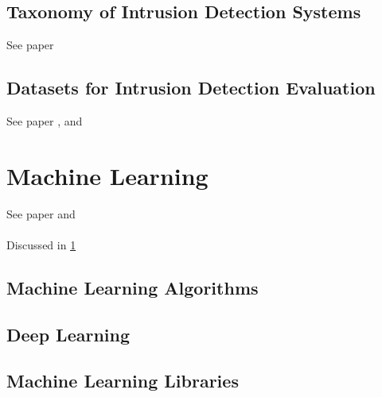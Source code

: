 \subsection{Taxonomy of Intrusion Detection Systems}

See paper \cite{Liu2019}


\subsection{Datasets for Intrusion Detection Evaluation}
\label{subsec:datasets-for-evaluation}

See paper \cite{icissp18}, \cite{Khraisat2019} and \cite{Leevy2020} \\

\lipsum[1-6]


\section{Machine Learning}
\label{sec:machine-learning}

See paper \cite{Khraisat2019} and \cite{Hodo2017} \\

\lipsum \\
Discussed in \ref{sec:machine-learning}


\subsection{Machine Learning Algorithms}
\label{subsec:ml-algorithms}

\lipsum


\subsection{Deep Learning}
\label{subsec:deep-learning}

\lipsum


\subsection{Machine Learning Libraries}
\label{subsec:ml-libraries}

\lipsum